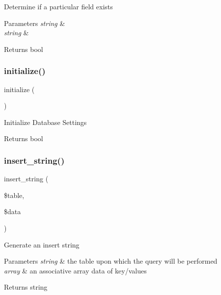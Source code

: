 Determine if a particular field exists


\begin{DoxyParams}{Parameters}
{\em string} & \\
\hline
{\em string} & \\
\hline
\end{DoxyParams}
\begin{DoxyReturn}{Returns}
bool 
\end{DoxyReturn}
\mbox{\label{class_c_i___d_b__driver_a91098fa7d1917ce4833f284bbef12627}} 
\subsubsection{\texorpdfstring{initialize()}{initialize()}}
{\footnotesize\ttfamily initialize (\begin{DoxyParamCaption}{ }\end{DoxyParamCaption})}

Initialize Database Settings

\begin{DoxyReturn}{Returns}
bool 
\end{DoxyReturn}
\mbox{\label{class_c_i___d_b__driver_ad27720d886add2c9abf9ac48a9ff56d5}} 
\subsubsection{\texorpdfstring{insert\+\_\+string()}{insert\_string()}}
{\footnotesize\ttfamily insert\+\_\+string (\begin{DoxyParamCaption}\item[{}]{\$table,  }\item[{}]{\$data }\end{DoxyParamCaption})}

Generate an insert string


\begin{DoxyParams}{Parameters}
{\em string} & the table upon which the query will be performed \\
\hline
{\em array} & an associative array data of key/values \\
\hline
\end{DoxyParams}
\begin{DoxyReturn}{Returns}
string 
\end{DoxyReturn}
\mbox{\label{class_c_i___d_b__driver_af435df5703c238769d6d16fde6d51182}} 
